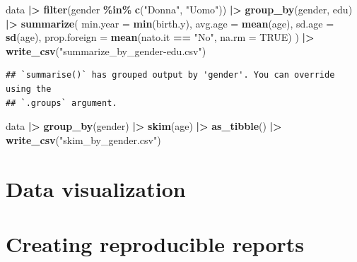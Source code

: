 \documentclass[
]{book}
\newenvironment{Shaded}{\begin{snugshade}}{\end{snugshade}}
\newcommand{\AttributeTok}[1]{\textcolor[rgb]{0.13,0.29,0.53}{#1}}
\newcommand{\ConstantTok}[1]{\textcolor[rgb]{0.56,0.35,0.01}{#1}}
\newcommand{\FunctionTok}[1]{\textcolor[rgb]{0.13,0.29,0.53}{\textbf{#1}}}
\newcommand{\NormalTok}[1]{#1}
\newcommand{\SpecialCharTok}[1]{\textcolor[rgb]{0.81,0.36,0.00}{\textbf{#1}}}
\newcommand{\StringTok}[1]{\textcolor[rgb]{0.31,0.60,0.02}{#1}}
\begin{document}
\begin{Shaded}
\begin{Highlighting}[]
\NormalTok{data }\SpecialCharTok{|\textgreater{}} 
  \FunctionTok{filter}\NormalTok{(gender }\SpecialCharTok{\%in\%} \FunctionTok{c}\NormalTok{(}\StringTok{"Donna"}\NormalTok{, }\StringTok{"Uomo"}\NormalTok{)) }\SpecialCharTok{|\textgreater{}} 
  \FunctionTok{group\_by}\NormalTok{(gender, edu) }\SpecialCharTok{|\textgreater{}} 
  \FunctionTok{summarize}\NormalTok{(}
    \AttributeTok{min.year =} \FunctionTok{min}\NormalTok{(birth.y),}
    \AttributeTok{avg.age =} \FunctionTok{mean}\NormalTok{(age),}
    \AttributeTok{sd.age =} \FunctionTok{sd}\NormalTok{(age),}
    \AttributeTok{prop.foreign =} \FunctionTok{mean}\NormalTok{(nato.it }\SpecialCharTok{==} \StringTok{"No"}\NormalTok{, }\AttributeTok{na.rm =} \ConstantTok{TRUE}\NormalTok{)}
\NormalTok{  ) }\SpecialCharTok{|\textgreater{}} 
  \FunctionTok{write\_csv}\NormalTok{(}\StringTok{"summarize\_by\_gender{-}edu.csv"}\NormalTok{)}
\end{Highlighting}
\end{Shaded}

\begin{verbatim}
## `summarise()` has grouped output by 'gender'. You can override using the
## `.groups` argument.
\end{verbatim}

\begin{Shaded}
\begin{Highlighting}[]
\NormalTok{data }\SpecialCharTok{|\textgreater{}} 
  \FunctionTok{group\_by}\NormalTok{(gender) }\SpecialCharTok{|\textgreater{}} 
  \FunctionTok{skim}\NormalTok{(age) }\SpecialCharTok{|\textgreater{}} 
  \FunctionTok{as\_tibble}\NormalTok{() }\SpecialCharTok{|\textgreater{}} 
  \FunctionTok{write\_csv}\NormalTok{(}\StringTok{"skim\_by\_gender.csv"}\NormalTok{)}
\end{Highlighting}
\end{Shaded}

\hypertarget{visualization}{%
\chapter{Data visualization}\label{visualization}}

\hypertarget{reproducible}{%
\chapter{Creating reproducible reports}\label{reproducible}}

  
\end{document}
